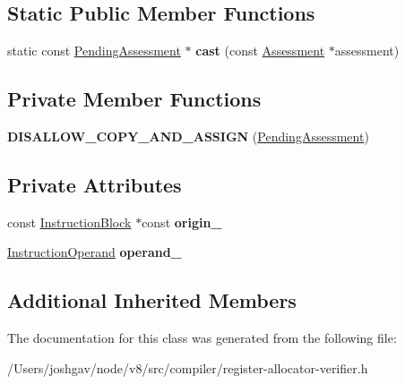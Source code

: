 \subsection*{Static Public Member Functions}
\begin{DoxyCompactItemize}
\item 
static const \hyperlink{classv8_1_1internal_1_1compiler_1_1_pending_assessment}{Pending\+Assessment} $\ast$ {\bfseries cast} (const \hyperlink{classv8_1_1internal_1_1compiler_1_1_assessment}{Assessment} $\ast$assessment)\hypertarget{classv8_1_1internal_1_1compiler_1_1_pending_assessment_ad87b5674863107086a5f071587838ad7}{}\label{classv8_1_1internal_1_1compiler_1_1_pending_assessment_ad87b5674863107086a5f071587838ad7}

\end{DoxyCompactItemize}
\subsection*{Private Member Functions}
\begin{DoxyCompactItemize}
\item 
{\bfseries D\+I\+S\+A\+L\+L\+O\+W\+\_\+\+C\+O\+P\+Y\+\_\+\+A\+N\+D\+\_\+\+A\+S\+S\+I\+GN} (\hyperlink{classv8_1_1internal_1_1compiler_1_1_pending_assessment}{Pending\+Assessment})\hypertarget{classv8_1_1internal_1_1compiler_1_1_pending_assessment_a35de581f1667e39981f1b11c6021239d}{}\label{classv8_1_1internal_1_1compiler_1_1_pending_assessment_a35de581f1667e39981f1b11c6021239d}

\end{DoxyCompactItemize}
\subsection*{Private Attributes}
\begin{DoxyCompactItemize}
\item 
const \hyperlink{classv8_1_1internal_1_1compiler_1_1_instruction_block}{Instruction\+Block} $\ast$const {\bfseries origin\+\_\+}\hypertarget{classv8_1_1internal_1_1compiler_1_1_pending_assessment_a095ed740da76aad996aeda32ba18043e}{}\label{classv8_1_1internal_1_1compiler_1_1_pending_assessment_a095ed740da76aad996aeda32ba18043e}

\item 
\hyperlink{classv8_1_1internal_1_1compiler_1_1_instruction_operand}{Instruction\+Operand} {\bfseries operand\+\_\+}\hypertarget{classv8_1_1internal_1_1compiler_1_1_pending_assessment_a42611f5d356f0458cb8bbe988f5fc7df}{}\label{classv8_1_1internal_1_1compiler_1_1_pending_assessment_a42611f5d356f0458cb8bbe988f5fc7df}

\end{DoxyCompactItemize}
\subsection*{Additional Inherited Members}


The documentation for this class was generated from the following file\+:\begin{DoxyCompactItemize}
\item 
/\+Users/joshgav/node/v8/src/compiler/register-\/allocator-\/verifier.\+h\end{DoxyCompactItemize}
